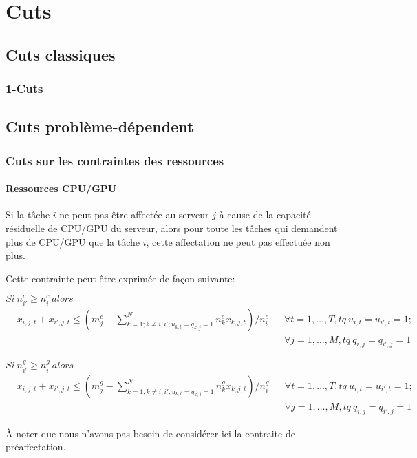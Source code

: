\documentclass[twoside,fleqn]{EPURapport}
\begin{document}
\chapter{Cuts}%
\section{Cuts classiques}
\subsection{1-Cuts}

\section{Cuts problème-dépendent}
\subsection{Cuts sur les contraintes des ressources}
\subsubsection{Ressources CPU/GPU}
Si la tâche $i$ ne peut pas être affectée au serveur $j$ à cause de la capacité résiduelle de CPU/GPU du serveur, alors pour toute les tâches qui demandent plus de CPU/GPU que la tâche $i$, cette affectation ne peut pas effectuée non plus.


Cette contrainte peut être exprimée de façon suivante:
\bigskip

$Si \  n^c_{i\prime}\geq n^c_{i}\ alors\;$
\begin{align} 
&x_{i,j,t}+x_{i\prime,j,t}\leq (m^c_j-\sum^N_{k=1; k\neq{i},i\prime;u_{k,t}=q_{k,j}=1}{n^c_kx_{k,j,t}})/n^c_i
&&\forall t=1,\ldots,T, tq\ u_{i,t}=u_{i\prime,t}=1; \nonumber \\
 & &&\forall j=1, \ldots, M, tq\ q_{i,j}=q_{i\prime,j}=1
\end{align} 
 
$Si\ n^g_{i\prime}\geq n^g_{i}\ alors\;$
\begin{align} 
&x_{i,j,t}+x_{i\prime,j,t}\leq (m^g_j-\sum^N_{k=1; k\neq{i},i\prime;u_{k,t}=q_{k,j}=1}{n^g_kx_{k,j,t}})/n^g_i 
&&\forall t=1,\ldots,T, tq\ u_{i,t}=u_{i\prime,t}=1; \nonumber \\
 & &&\forall j=1, \ldots, M, tq\ q_{i,j}=q_{i\prime,j}=1
\end{align} 


À noter que nous n'avons pas besoin de considérer ici la contraite de préaffectation.
\end{document}
